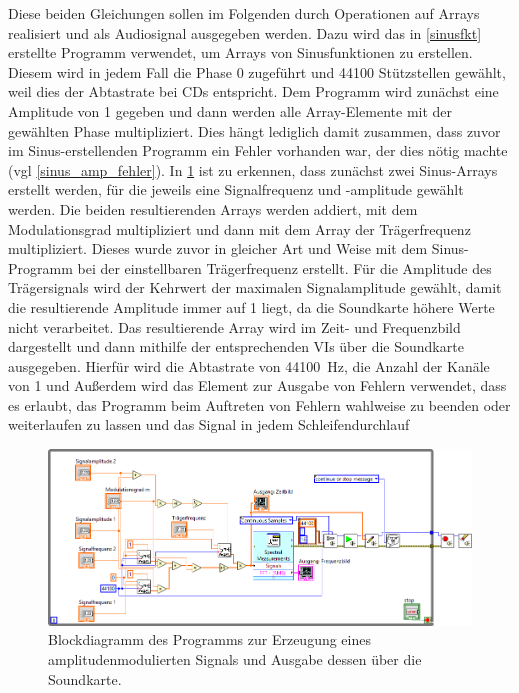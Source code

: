 \documentclass[
a4paper,
12pt,
pagesize,
ngerman
]{scrartcl}
\begin{document}
	Diese beiden Gleichungen sollen im Folgenden durch Operationen auf Arrays realisiert und als Audiosignal ausgegeben werden.	
	Dazu wird das in \cref{sinusfkt} erstellte Programm verwendet, um Arrays von Sinusfunktionen zu erstellen.
	Diesem wird in jedem Fall die Phase 0 zugeführt und 44100 Stützstellen gewählt, weil dies der Abtastrate bei CDs entspricht.
	Dem Programm wird zunächst eine Amplitude von 1 gegeben und dann werden alle Array-Elemente mit der gewählten Phase multipliziert.
	Dies hängt lediglich damit zusammen, dass zuvor im Sinus-erstellenden Programm ein Fehler vorhanden war, der dies nötig machte (vgl \cref{sinus_amp_fehler}).
	In \cref{fig_tag3_am_soundkarte_block} ist zu erkennen, dass zunächst zwei Sinus-Arrays erstellt werden, für die jeweils eine Signalfrequenz und -amplitude gewählt werden.
	Die beiden resultierenden Arrays werden addiert, mit dem Modulationsgrad multipliziert und dann mit dem Array der Trägerfrequenz multipliziert.
	Dieses wurde zuvor in gleicher Art und Weise mit dem Sinus-Programm bei der einstellbaren Trägerfrequenz erstellt.
	Für die Amplitude des Trägersignals wird der Kehrwert der maximalen Signalamplitude gewählt, damit die resultierende Amplitude immer auf 1 liegt, da die Soundkarte höhere Werte nicht verarbeitet.
	Das resultierende Array wird im Zeit- und Frequenzbild dargestellt und dann mithilfe der entsprechenden VIs über die Soundkarte ausgegeben. %
	Hierfür wird die Abtastrate von \SI{44100}{\hertz}, die Anzahl der Kanäle von 1 und %
	Außerdem wird das Element zur Ausgabe von Fehlern verwendet, dass es erlaubt, das Programm beim Auftreten von Fehlern wahlweise zu beenden oder weiterlaufen zu lassen und das Signal in jedem Schleifendurchlauf 
	
	\begin{figure}[H]  
		\includegraphics[width=1\textwidth]{EIRE2018Dateien/Tag3/Soundkarteoutoszi/AMd}
		\centering
		\caption{
			Blockdiagramm des Programms zur Erzeugung eines amplitudenmodulierten Signals und Ausgabe dessen über die Soundkarte.
		}
		\label{fig_tag3_am_soundkarte_block}
		\centering
	\end{figure}
	
\end{document}
